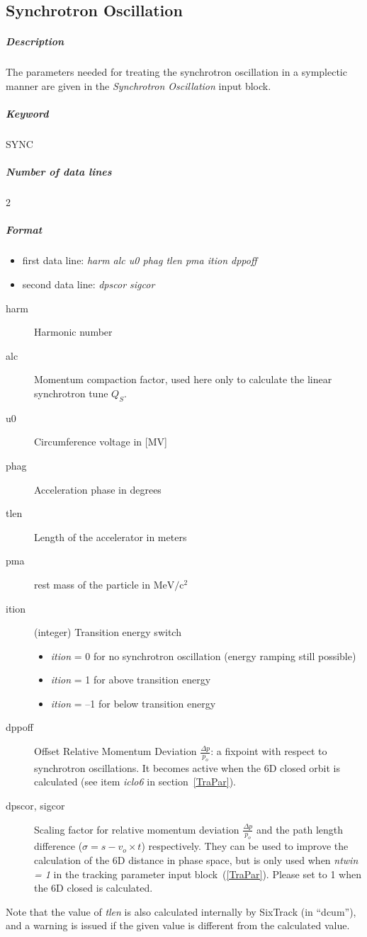 \subsection{Synchrotron Oscillation} \label{SynOsc}

\subparagraph{Description} The parameters needed for treating the
synchrotron oscillation in a symplectic manner are given in the {\em
  Synchrotron Oscillation} \/input block.

\subparagraph{Keyword} SYNC \subparagraph{Number of data lines} 2

\subparagraph{Format}
\begin{itemize}
\item first data line: {\em harm alc u0 phag tlen pma ition dppoff}
\item second data line: {\em dpscor sigcor}
\end{itemize}

\begin{description}
\item [harm] Harmonic number
\item [alc] Momentum compaction factor, used here only to calculate
  the linear synchrotron tune $ Q_{S} $.
\item [u0] Circumference voltage in [MV]
\item [phag] Acceleration phase in degrees
\item [tlen] Length of the accelerator in meters
\item [pma] rest mass of the particle in $ \mathrm{MeV}/\mathrm{c}^{2}
  $
\item [ition] (integer) Transition energy switch
 \begin{itemize}
 \item {\em ition} = \hspace{.3mm} 0 for no synchrotron oscillation
   (energy ramping still possible)
 \item {\em ition} = \hspace{.5mm} 1 for above transition energy
 \item {\em ition} = --1 for below transition energy
 \end{itemize}
\item [dppoff]  Offset Relative Momentum Deviation \mbox{$ \frac{\Delta
      p}{p_o} $}: a fixpoint with respect to synchrotron oscillations.
  It becomes active when the 6D closed orbit is calculated (see item
  {\it iclo6} \/in section~\ref{TraPar}).
\item [dpscor, sigcor] Scaling factor for relative momentum deviation
  \mbox{$ \frac{\Delta p}{p_o} $} and the path length difference
  ($\sigma = s - v_o \times t$) respectively.  They can be used to
  improve the calculation of the 6D distance in phase space, but is
  only used when {\em ntwin = 1} \/in the tracking parameter input
  block~(\ref{TraPar}). Please set to 1 when the 6D closed is
  calculated.
\end{description}
Note that the value of \emph{tlen} is also calculated internally by SixTrack (in ``dcum''), and a warning is issued if the given value is different from the calculated value.

